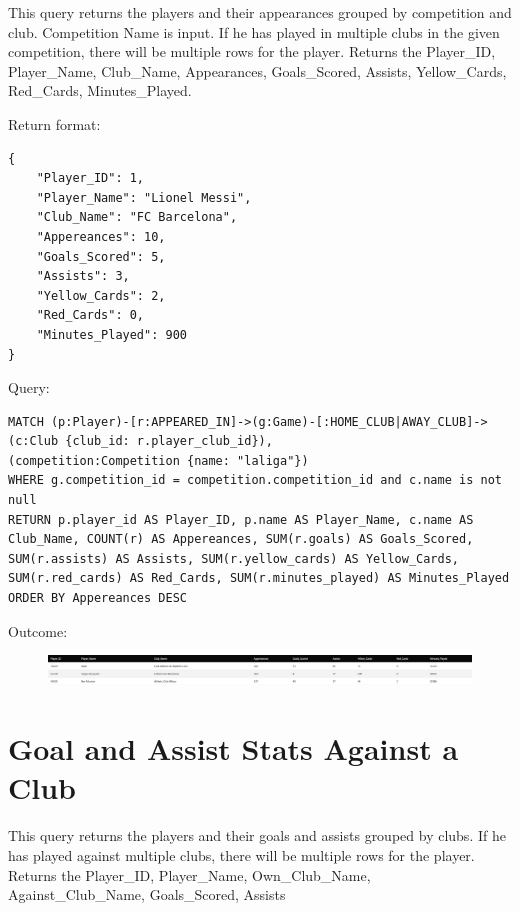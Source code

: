 \documentclass{Configuration_Files/PoliMi3i_thesis}
\begin{document}
This query returns the players and their appearances grouped by competition and club. Competition Name is input.
If he has played in multiple clubs in the given competition, there will be multiple rows for the player.
Returns the Player\_ID, Player\_Name, Club\_Name, Appearances, Goals\_Scored, Assists, Yellow\_Cards, Red\_Cards, Minutes\_Played.

Return format:

\begin{lstlisting}[style=json]
{
    "Player_ID": 1,
    "Player_Name": "Lionel Messi",
    "Club_Name": "FC Barcelona",
    "Appereances": 10,
    "Goals_Scored": 5,
    "Assists": 3,
    "Yellow_Cards": 2,
    "Red_Cards": 0,
    "Minutes_Played": 900
}
\end{lstlisting}


Query:

\begin{lstlisting}[language=Cypher]
MATCH (p:Player)-[r:APPEARED_IN]->(g:Game)-[:HOME_CLUB|AWAY_CLUB]->(c:Club {club_id: r.player_club_id}),
(competition:Competition {name: "laliga"})
WHERE g.competition_id = competition.competition_id and c.name is not null
RETURN p.player_id AS Player_ID, p.name AS Player_Name, c.name AS Club_Name, COUNT(r) AS Appereances, SUM(r.goals) AS Goals_Scored, SUM(r.assists) AS Assists, SUM(r.yellow_cards) AS Yellow_Cards, SUM(r.red_cards) AS Red_Cards, SUM(r.minutes_played) AS Minutes_Played
ORDER BY Appereances DESC
\end{lstlisting}


Outcome:

\begin{figure}[H]
    \centering
    \includegraphics[width=\linewidth]{Project Template/Images/query_output/q1.png}
\end{figure}



\section{Goal and Assist Stats Against a Club}

This query returns the players and their goals and assists grouped by clubs.
If he has played against multiple clubs, there will be multiple rows for the player.
Returns the Player\_ID, Player\_Name, Own\_Club\_Name, Against\_Club\_Name, Goals\_Scored, Assists
\end{document}
